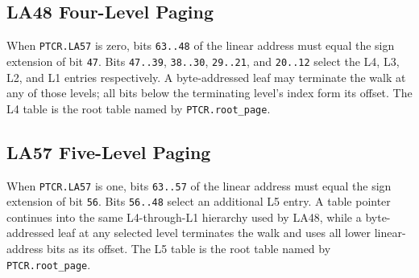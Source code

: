 \clearpage
\subsection{LA48 Four-Level Paging}

When \texttt{PTCR.LA57} is zero, bits \texttt{63..48} of the linear address must equal the sign extension of bit
\texttt{47}. Bits \texttt{47..39}, \texttt{38..30}, \texttt{29..21}, and \texttt{20..12} select the L4, L3, L2,
and L1 entries respectively. A byte-addressed leaf may terminate the walk at any of those levels; all bits below
the terminating level's index form its offset. The L4 table is the root table named by \texttt{PTCR.root\_page}.



\clearpage
\subsection{LA57 Five-Level Paging}

When \texttt{PTCR.LA57} is one, bits \texttt{63..57} of the linear address must equal the sign extension of bit
\texttt{56}. Bits \texttt{56..48} select an additional L5 entry. A table pointer continues into the same
L4-through-L1 hierarchy used by LA48, while a byte-addressed leaf at any selected level terminates the walk and uses
all lower linear-address bits as its offset. The L5 table is the root table named by \texttt{PTCR.root\_page}.


